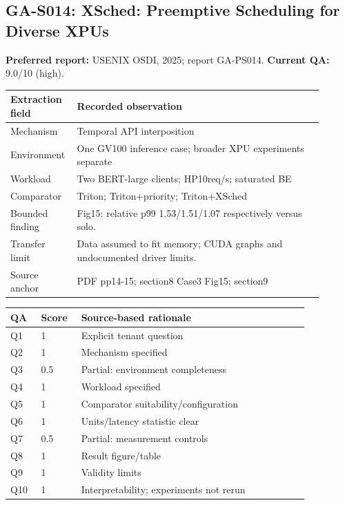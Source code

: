 \subsection{GA-S014: XSched: Preemptive Scheduling for Diverse XPUs}
\textbf{Preferred report:} USENIX OSDI, 2025; report GA-PS014. \textbf{Current QA:} 9.0/10 (high).
\begin{longtable}{P{0.15\linewidth}P{0.75\linewidth}}
\toprule Extraction field & Recorded observation\\\midrule\endhead
Mechanism & Temporal API interposition\\
Environment & One GV100 inference case; broader XPU experiments separate\\
Workload & Two BERT-large clients; HP10req/s; saturated BE\\
Comparator & Triton; Triton+priority; Triton+XSched\\
Bounded finding & Fig15: relative p99 1.53/1.51/1.07 respectively versus solo.\\
Transfer limit & Data assumed to fit memory; CUDA graphs and undocumented driver limits.\\
Source anchor & PDF pp14-15; section8 Case3 Fig15; section9\\
\bottomrule\end{longtable}
\begin{longtable}{P{0.09\linewidth}P{0.10\linewidth}P{0.67\linewidth}}
\toprule QA & Score & Source-based rationale\\\midrule\endhead
Q1 & 1 & Explicit tenant question\\
Q2 & 1 & Mechanism specified\\
Q3 & 0.5 & Partial: environment completeness\\
Q4 & 1 & Workload specified\\
Q5 & 1 & Comparator suitability/configuration\\
Q6 & 1 & Units/latency statistic clear\\
Q7 & 0.5 & Partial: measurement controls\\
Q8 & 1 & Result figure/table\\
Q9 & 1 & Validity limits\\
Q10 & 1 & Interpretability; experiments not rerun\\
\bottomrule\end{longtable}

